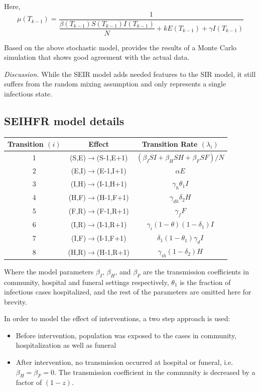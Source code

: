\documentclass[10pt, journal,onecolumn]{IEEEtran}
\begin{document}
Here,
\[
\mu (T_{k-1}) = \frac{1}{\dfrac{\beta(T_{k-1}) S(T_{k-1}) I(T_{k-1})}{N} + k E(T_{k-1}) + \gamma I(T_{k-1})}
\]

Based on the above stochastic model, \citep{chowell2004basic} provides the results of a Monte Carlo
simulation that shows good agreement with the actual data.

\textit{Discussion.} While the SEIR model adds needed features to the SIR model, it still suffers
from the random mixing assumption and only represents a single infectious state.

\subsection{SEIHFR model details}


\begin{center}
\begin{tabular}{|c|c|c|}
\hline
Transition $(i)$ & Effect & Transition Rate $(\lambda_i)$ \tabularnewline
\hline
\hline
1 & (S,E)$\to$(S-1,E+1) & $(\beta_{I}SI+\beta_{H}SH+\beta_{F}SF)/N$\tabularnewline
\hline
2 & (E,I)$\to$(E-1,I+1) & $\alpha E$\tabularnewline
\hline
3 & (I,H)$\to$(I-1,H+1) & $\gamma_{h}\theta_{1}I$\tabularnewline
\hline
4 & (H,F)$\to$(H-1,F+1) & $\gamma_{dh}\delta_{2}H$\tabularnewline
\hline
5 & (F,R)$\to$(F-1,R+1) & $\gamma_{f}F$\tabularnewline
\hline
6 & (I,R)$\to$(I-1,R+1) & $\gamma_{i}(1-\theta)(1-\delta_{1})I$\tabularnewline
\hline
7 & (I,F)$\to$(I-1,F+1) & $\delta_{1}(1-\theta_{1})\gamma_{d}I$\tabularnewline
\hline
8 & (H,R)$\to$(H-1,R+1) & $\gamma_{ih}(1-\delta_{2})H$\tabularnewline
\hline
\end{tabular}
\end{center}

Where the model parameters $\beta_I$, $\beta_H$, and $\beta_F$ are the transmission
coefficients in community, hospital and funeral settings respectively, $\theta_1$ is the fraction of infectious
cases hospitalized, and the rest of the parameters are omitted here for brevity.

In order to model the effect of interventions, a two step approach is used:

\begin{itemize}
\item Before intervention, population was exposed to the cases in community, hospitalization as well as funeral
\item After intervention, no transmission occurred at hospital or funeral, i.e. $\beta_H = \beta_F = 0$. The transmission coefficient in the community is decreased by a factor of $(1-z)$.
\end{itemize}
\end{document}
